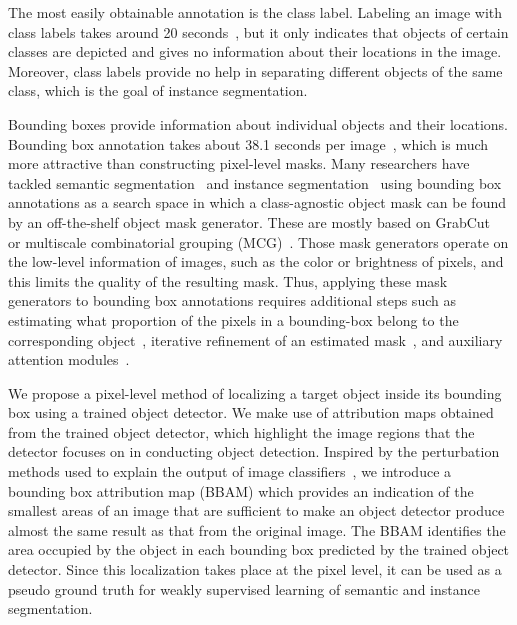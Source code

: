 \documentclass[final]{cvpr}
\begin{document}
The most easily obtainable annotation is the class label.
Labeling an image with class labels takes around 20 seconds~\cite{bearman2016s},
but it only indicates that objects of certain classes are depicted and gives no information about their locations in the image. Moreover, class labels provide no help in separating different objects of the same class, which is the goal of instance segmentation.


Bounding boxes provide information about individual objects and their locations.
Bounding box annotation takes about 38.1 seconds per image~\cite{bellver2019budget}, which is much more attractive than constructing pixel-level masks.
Many researchers have tackled semantic segmentation~\cite{dai2015boxsup, khoreva2017simple, song2019box, kulharia12356box2seg} and instance segmentation~\cite{khoreva2017simple, liao2019weakly, sun2020weakly, hsu2019weakly, arun2020weakly} using bounding box annotations as a search space in which a class-agnostic object mask can be found by an off-the-shelf object mask generator. These are mostly based on GrabCut~\cite{rother2004grabcut} or multiscale combinatorial grouping (MCG)~\cite{pont2016multiscale}.
Those mask generators operate on the low-level information of images, such as the color or brightness of pixels, and this limits the quality of the resulting mask. 
Thus, applying these mask generators to bounding box annotations requires additional steps such as estimating what proportion of the pixels in a bounding-box belong to the corresponding object~\cite{song2019box, kulharia12356box2seg}, iterative refinement of an estimated mask~\cite{dai2015boxsup}, and auxiliary attention modules~\cite{kulharia12356box2seg}.


We propose a pixel-level method of localizing a target object inside its bounding box using a trained object detector.
We make use of attribution maps obtained from the trained object detector, which highlight the image regions that the detector focuses on in conducting object detection.
Inspired by the perturbation methods used to explain the output of image classifiers~\cite{fong2017interpretable, fong2019understanding, dabkowski2017real}, we introduce a bounding box attribution map (BBAM) which provides an indication of the smallest areas of an image that are sufficient to make an object detector produce almost the same result as that from the original image.
The BBAM identifies the area occupied by the object in each bounding box predicted by the trained object detector.
Since this localization takes place at the pixel level, it can be used as a pseudo ground truth for weakly supervised learning of semantic and instance segmentation.
\end{document}
